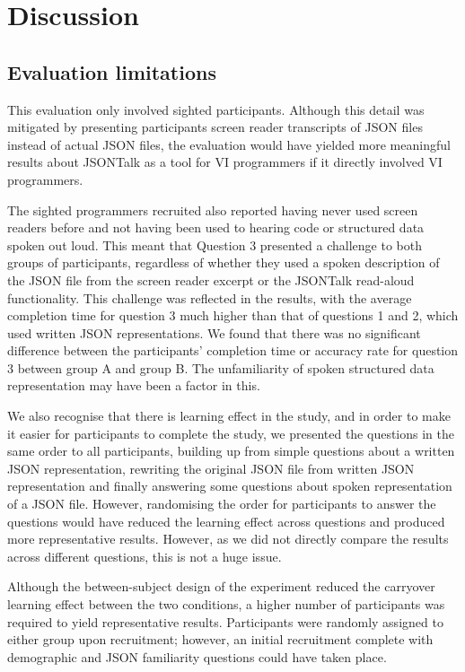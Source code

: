\documentclass{l4proj}
\begin{document}
\section{Discussion}
\subsection{Evaluation limitations}

This evaluation only involved sighted participants. Although this detail was mitigated by presenting participants screen reader transcripts of JSON files instead of actual JSON files, the evaluation would have yielded more meaningful results about JSONTalk as a tool for VI programmers if it directly involved VI programmers. 

The sighted programmers recruited also reported having never used screen readers before and not having been used to hearing code or structured data spoken out loud. This meant that Question 3 presented a challenge to both groups of participants, regardless of whether they used a spoken description of the JSON file from the screen reader excerpt or the JSONTalk read-aloud functionality. This challenge was reflected in the results, with the average completion time for question 3 much higher than that of questions 1 and 2, which used written JSON representations. We found that there was no significant difference between the participants' completion time or accuracy rate for question 3 between group A and group B. The unfamiliarity of spoken structured data representation may have been a factor in this.

We also recognise that there is learning effect in the study, and in order to make it easier for participants to complete the study, we presented the questions in the same order to all participants, building up from simple questions about a written JSON representation, rewriting the original JSON file from written JSON representation and finally answering some questions about spoken representation of a JSON file. However, randomising the order for participants to answer the questions would have reduced the learning effect across questions and produced more representative results. However, as we did not directly compare the results across different questions, this is not a huge issue.

Although the between-subject design of the experiment reduced the carryover learning effect between the two conditions, a higher number of participants was required to yield representative results. Participants were randomly assigned to either group upon recruitment; however, an initial recruitment complete with demographic and JSON familiarity questions could have taken place.  
\end{document}
